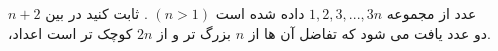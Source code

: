 \exercise
$n + 2$
عدد از مجموعه
${1, 2, 3, ..., 3n}$
داده شده است
$(n > 1)$
. ثابت کنید در بین اعداد‫‪،‬‬ دو عدد یافت می شود که تفاضل آن ها از
$n$
بزرگ تر و از
$2n$
کوچک تر است.